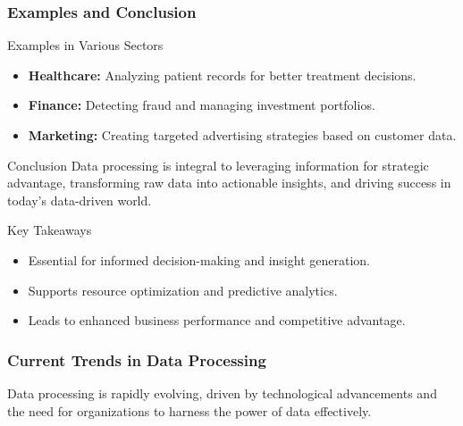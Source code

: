 \documentclass[aspectratio=169]{beamer}
\begin{document}
\begin{frame}[fragile]
    \frametitle{Examples and Conclusion}
    \begin{block}{Examples in Various Sectors}
        \begin{itemize}
            \item \textbf{Healthcare:} Analyzing patient records for better treatment decisions.
            \item \textbf{Finance:} Detecting fraud and managing investment portfolios.
            \item \textbf{Marketing:} Creating targeted advertising strategies based on customer data.
        \end{itemize}
    \end{block}

    \begin{block}{Conclusion}
        Data processing is integral to leveraging information for strategic advantage, transforming raw data into actionable insights, and driving success in today's data-driven world.
    \end{block}
    
    \begin{block}{Key Takeaways}
        \begin{itemize}
            \item Essential for informed decision-making and insight generation.
            \item Supports resource optimization and predictive analytics.
            \item Leads to enhanced business performance and competitive advantage.
        \end{itemize}
    \end{block}
\end{frame}

\begin{frame}[fragile]
    \frametitle{Current Trends in Data Processing}
    Data processing is rapidly evolving, driven by technological advancements and the need for organizations to harness the power of data effectively.
\end{frame}
\end{document}

